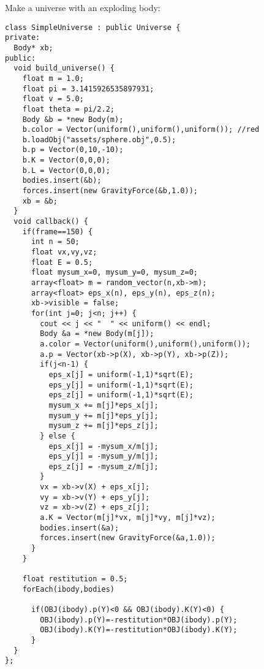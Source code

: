 \noindent
Make a universe with an exploding body: \begin{lstlisting}
class SimpleUniverse : public Universe {
private:
  Body* xb;
public:
  void build_universe() {
    float m = 1.0;
    float pi = 3.1415926535897931;
    float v = 5.0;
    float theta = pi/2.2;
    Body &b = *new Body(m);
    b.color = Vector(uniform(),uniform(),uniform()); //red
    b.loadObj("assets/sphere.obj",0.5);
    b.p = Vector(0,10,-10);
    b.K = Vector(0,0,0);
    b.L = Vector(0,0,0);
    bodies.insert(&b);
    forces.insert(new GravityForce(&b,1.0));
    xb = &b;
  }
  void callback() {
    if(frame==150) {
      int n = 50;
      float vx,vy,vz;
      float E = 0.5;
      float mysum_x=0, mysum_y=0, mysum_z=0;
      array<float> m = random_vector(n,xb->m);
      array<float> eps_x(n), eps_y(n), eps_z(n);
      xb->visible = false;
      for(int j=0; j<n; j++) {
        cout << j << "  " << uniform() << endl;
        Body &a = *new Body(m[j]);
        a.color = Vector(uniform(),uniform(),uniform());
        a.p = Vector(xb->p(X), xb->p(Y), xb->p(Z));
        if(j<n-1) {
          eps_x[j] = uniform(-1,1)*sqrt(E);
          eps_y[j] = uniform(-1,1)*sqrt(E);
          eps_z[j] = uniform(-1,1)*sqrt(E);
          mysum_x += m[j]*eps_x[j];
          mysum_y += m[j]*eps_y[j];
          mysum_z += m[j]*eps_z[j];
        } else {
          eps_x[j] = -mysum_x/m[j];
          eps_y[j] = -mysum_y/m[j];
          eps_z[j] = -mysum_z/m[j];
        }
        vx = xb->v(X) + eps_x[j];
        vy = xb->v(Y) + eps_y[j];
        vz = xb->v(Z) + eps_z[j];
        a.K = Vector(m[j]*vx, m[j]*vy, m[j]*vz);
        bodies.insert(&a);
        forces.insert(new GravityForce(&a,1.0));
      }
    }

    float restitution = 0.5;
    forEach(ibody,bodies)

      if(OBJ(ibody).p(Y)<0 && OBJ(ibody).K(Y)<0) {
        OBJ(ibody).p(Y)=-restitution*OBJ(ibody).p(Y);
        OBJ(ibody).K(Y)=-restitution*OBJ(ibody).K(Y);
      }
  }
};
\end{lstlisting}
\noindent
